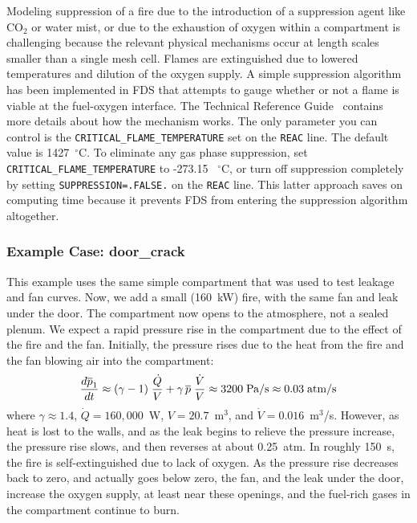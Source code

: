 \documentclass[11pt]{book}
\newcommand{\ct}{\tt\small}
\newcommand{\dQ}{\dot{Q}}
\newcommand{\be}{\begin{equation}}
\newcommand{\ee}{\end{equation}}
\begin{document}
\label{info:extinction}

Modeling suppression of a fire due to the introduction of a suppression
agent like CO$_2$ or water mist, or due to the exhaustion of oxygen
within a compartment is challenging because
the relevant physical mechanisms occur at length scales smaller than a
single mesh cell. Flames are extinguished due to lowered
temperatures and dilution of the oxygen supply. A simple
suppression algorithm has been implemented in FDS that attempts to
gauge whether or not a flame is viable at the fuel-oxygen interface. The Technical Reference Guide~\cite{FDS_Math_Guide}
contains more details about how the mechanism works. The only
parameter you can control is the {\ct CRITICAL\_FLAME\_TEMPERATURE} set on the {\ct REAC} line.
The default value is 1427~$^\circ$C.
To eliminate any gas phase suppression, set  {\ct CRITICAL\_FLAME\_TEMPERATURE} to -273.15 ~$^\circ$C, or turn off suppression completely
by setting {\ct SUPPRESSION=.FALSE.} on the {\ct REAC} line. This latter approach saves on computing time because it
prevents FDS from entering the suppression algorithm altogether.

\subsubsection{Example Case: door\_crack}

This example uses the same simple compartment that was used to test leakage and fan curves. Now, we add a small (160~kW) fire, with the same
fan and leak under the door. The compartment now opens to the atmosphere, not a sealed plenum. We expect a rapid pressure rise in the compartment due to the effect of the
fire and the fan. Initially, the pressure rises due to the heat from the fire and the fan blowing air into the compartment:
\be \frac{d \overline{p}_1}{dt} \approx (\gamma - 1) \; \frac{\dQ}{V} + \gamma \, \overline{p} \; \frac{ \dot{V} }{V} \approx 3200 \; \hbox{Pa/s}  \approx 0.03 \; \hbox{atm/s}   \ee
where $\gamma \approx 1.4$, $\dot{Q}=160,000$~W, $V=20.7$~m$^3$, and $\dot{V}=0.016$~m$^3$/s. However, as heat is lost to the walls, and as the leak begins to relieve the
pressure increase, the pressure rise slows, and then reverses at about 0.25~atm. In roughly 150~s, the fire
is self-extinguished due to lack of oxygen. As the pressure rise decreases back to zero, and actually goes below zero, the fan, and the leak under the
door, increase the oxygen supply, at least near these openings, and the fuel-rich gases in the compartment continue to burn.
\end{document}
